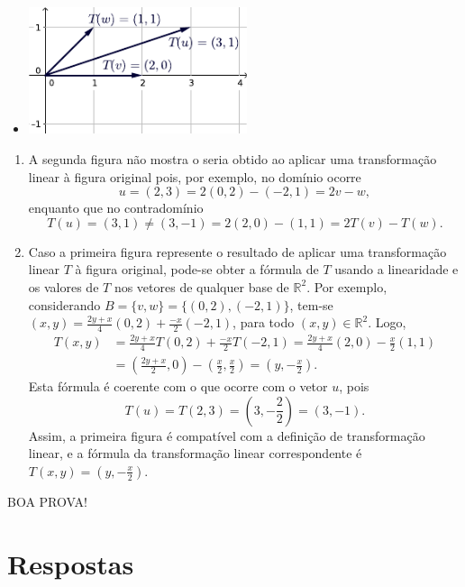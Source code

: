 \documentclass[12pt,a4paper]{article}
\newcommand*\R{\mathbb{R}}
\begin{document}
\begin{ExerciseList}
\begin{enumerate}
\begin{multicols}{2}
\begin{itemize}
\item[] \includegraphics[width=6.4cm]{img/prova-3-nex-vetores-img2}
\end{itemize}
\end{multicols}
\end{enumerate}
\Answer
\begin{enumerate}
\item A segunda figura não mostra o seria obtido ao aplicar uma transformação linear à figura original pois, por exemplo, no domínio ocorre
\[
u = (2,3) = 2(0,2)-(-2,1) = 2v - w,
\]
enquanto que no contradomínio
\[
T(u) = (3,1) \neq (3,-1) = 2(2,0)-(1,1) = 2T(v) - T(w).
\]

\item Caso a primeira figura represente o resultado de aplicar uma transformação linear $T$ à figura original, pode-se obter a fórmula de $T$ usando a linearidade e os valores de $T$ nos vetores de qualquer base de $\R^2$. Por exemplo, considerando $B = \{ v, w \} = \{ (0,2), (-2,1) \}$, tem-se $(x,y) = \frac{2y+x}{4}(0,2) + \frac{-x}{2}(-2,1)$, para todo $(x,y) \in \R^2$. Logo,
\begin{align*}
T(x,y)
& = \frac{2y+x}{4}T(0,2) + \frac{-x}{2}T(-2,1)
  = \frac{2y+x}{4}(2,0) - \frac{x}{2}(1,1) \\
& = \left(\frac{2y+x}{2}, 0\right) - \left(\frac{x}{2}, \frac{x}{2}\right)
  = \left(y, -\frac{x}{2}\right).
\end{align*}
Esta fórmula é coerente com o que ocorre com o vetor $u$, pois
\[
T(u) = T(2,3) = \left(3,-\frac{2}{2}\right) = (3,-1).
\]
Assim, a primeira figura é compatível com a definição de transformação linear, e a fórmula da transformação linear correspondente é $T(x,y) = \left(y, -\frac{x}{2}\right)$.
\end{enumerate}

\end{ExerciseList}

\begin{center}
BOA PROVA!
\end{center}

\newpage
\restoregeometry
\section*{Respostas}
\shipoutAnswer
\end{document}
